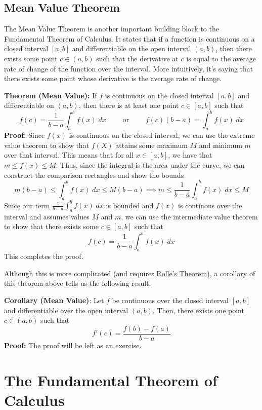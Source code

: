 \documentclass[8pt]{extarticle}
\begin{document}
\subsection{Mean Value Theorem}
The Mean Value Theorem is another important building block to the Fundamental Theorem of Calculus. It states that if a function is continuous on a closed interval $[a,b]$ and differentiable on the open interval $(a,b)$, then there exists some point $c \in (a,b)$ such that the derivative at $c$ is equal to the average rate of change of the function over the interval. More intuitively, it's saying that there exists some point whose derivative is the average rate of change.
\begin{boxedsection}
\textbf{Theorem (Mean Value):} If $f$ is continuous on the closed interval $[a,b]$ and differentiable on $(a,b)$, then there is at least one point $c \in [a,b]$ such that
$$
f(c) = \frac{1}{b-a} \int_a^b f(x)\;dx \quad \quad \text{ or } \quad \quad f(c)(b-a) = \int_a^b f(x)\;dx
$$
\textbf{Proof:} Since $f(x)$ is continuous on the closed interval, we can use the extreme value theorem to show that $f(X)$ attains some maximum $M$ and minimum $m$ over that interval. This means that for all $x \in [a,b]$, we have that $m \leq f(x) \leq M$. Thus, since the integral is the area under the curve, we can construct the comparison rectangles and show the bounds
$$
m(b-a) \leq \int_a^b f(x)\;dx \leq M(b-a) \implies m \leq \frac{1}{b-a} \int_a^b f(x)\;dx \leq M
$$
Since our term $\frac{1}{b-a} \int_a^b f(x)\;dx$ is bounded and $f(x)$ is continous over the interval and assumes values $M$ and $m$, we can use the intermediate value  theorem to show that there exists some $c \in [a,b]$ such that
$$
f(c) = \frac{1}{b-a} \int_a^b f(x)\;dx
$$
This completes the proof.
\end{boxedsection}
Although this is more complicated (and requires \href{https://mathcenter.oxford.emory.edu/site/math111/proofs/rollesTheorem/}{Rolle's Theorem}), a corollary of this theorem above tells us the following result.
\begin{boxedsection}
  \textbf{Corollary (Mean Value)}: Let $f$ be continuous over the closed interval $[a,b]$ and differentiable over the open interval $(a,b)$. Then, there exists one point $c \in (a,b)$ such that
  $$
  f'(c) = \frac{f(b)-f(a)}{b-a}
  $$
  \textbf{Proof:} The proof will be left as an exercise.
\end{boxedsection}
\pagebreak
\section{The Fundamental Theorem of Calculus}
\end{document}
